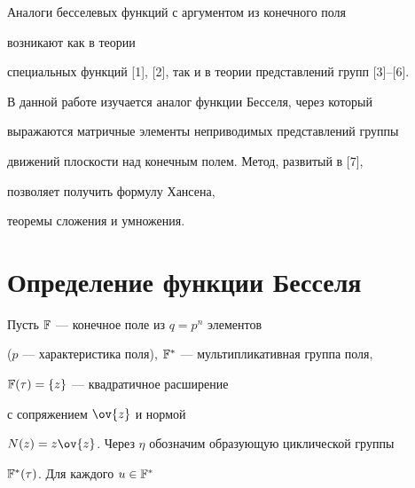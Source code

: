 




\date{}




\pagestyle{plain} %







\maketitle


\label{begin}





Аналоги бесселевых функций с аргументом из конечного поля 


возникают как в теории


специальных функций [1], [2], так и в теории представлений групп [3]--[6].


В данной работе изучается аналог функции Бесселя, через который


выражаются матричные элементы неприводимых представлений группы


движений плоскости над конечным полем. Метод, развитый в [7],


позволяет получить формулу Хансена,


теоремы сложения и умножения.





\section{Определение функции Бесселя}





Пусть $\Bbb F$ --- конечное поле из $q=p^n$ элементов


($p$ --- характеристика поля), $\Bbb F^*$ --- мультипликативная группа поля,


$\Bbb F(\tau)=\{z\}$ --- квадратичное расширение


с сопряжением $\ov{z}$ и нормой


$N(z)=z\ov{z}$. Через $\eta$ обозначим образующую циклической группы


$\Bbb F^*(\tau)$. Для каждого $u\in{\Bbb F^*}$


